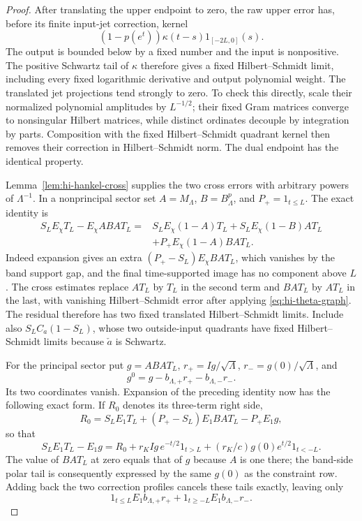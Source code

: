 \begin{proof}
After translating the upper endpoint to zero, the raw upper error has,
before its finite input-jet correction, kernel
\[
                 (1-p(e^t))\kappa(t-s)1_{[-2L,0]}(s).
\]
The output is bounded below by a fixed number and the input is
nonpositive. The positive Schwartz tail of $\kappa$ therefore gives a
fixed Hilbert--Schmidt limit, including every fixed logarithmic derivative
and output polynomial weight. The translated jet projections tend strongly
to zero. To check this directly, scale their normalized polynomial
amplitudes by $L^{-1/2}$; their fixed Gram matrices converge to nonsingular
Hilbert matrices, while distinct ordinates decouple by integration by
parts. Composition with the fixed Hilbert--Schmidt quadrant kernel then
removes their correction in Hilbert--Schmidt norm. The dual endpoint has
the identical property.

Lemma~\ref{lem:hi-hankel-cross} supplies the two cross errors with
arbitrary powers of $\Lambda^{-1}$. In a nonprincipal sector set
$A=M_\Lambda$, $B=B_\Lambda^p$, and $P_+=1_{t\le L}$. The exact
identity is
\begin{align*}
 S_LE_\chi T_L-E_\chi ABA T_L
   ={}&S_LE_\chi(1-A)T_L
      +S_LE_\chi(1-B)AT_L\\
     &+P_+E_\chi(1-A)BAT_L.
\end{align*}
Indeed expansion gives an extra $(P_+-S_L)E_\chi BAT_L$, which vanishes
by the band support gap, and the final time-supported image has no
component above $L$. The cross estimates replace $AT_L$ by $T_L$ in
the second term and $BAT_L$ by $AT_L$ in the last, with vanishing
Hilbert--Schmidt error after applying \eqref{eq:hi-theta-graph}.
The residual therefore has two fixed translated Hilbert--Schmidt limits.
Include also $S_LC_a(1-S_L)$, whose two outside-input quadrants have
fixed Hilbert--Schmidt limits because $\check a$ is Schwartz.

For the principal sector put $g=ABA T_L$,
$r_+=Ig/\sqrt\Lambda$, $r_-=g(0)/\sqrt\Lambda$, and
\[
 g^0=g-b_{\Lambda,+}r_+-b_{\Lambda,-}r_-.
\]
Its two coordinates vanish. Expansion of the preceding identity now has
the following exact form. If $R_0$ denotes its three-term right side,
\[
 R_0=S_LE_1T_L+(P_+-S_L)E_1BAT_L-P_+E_1g,
\]
so that
\[
 S_LE_1T_L-E_1g
 =R_0+r_KIg\,e^{-t/2}1_{t>L}
       +(r_K/c)g(0)e^{t/2}1_{t<-L}.
\]
The value of $BAT_L$ at zero equals that of $g$ because $A$ is
one there; the band-side polar tail is consequently expressed by
the same $g(0)$ as the constraint row.
Adding back the two correction profiles cancels these tails exactly,
leaving only
\begin{equation}\label{eq:hi-principal-boundaries}
 1_{t\le L}E_1b_{\Lambda,+}r_+
       +1_{t\ge-L}E_1b_{\Lambda,-}r_-.
\end{equation}


\end{proof}
